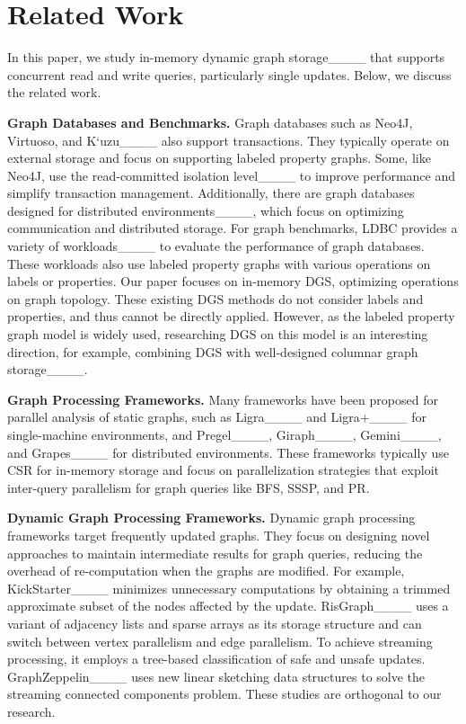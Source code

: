 \section{Related Work}
\label{sec:related_work}

In this paper, we study in-memory dynamic graph storage____ that supports concurrent read and write queries, particularly single updates. Below, we discuss the related work.

\noindent\textbf{Graph Databases and Benchmarks.} Graph databases such as Neo4J, Virtuoso, and K`uzu____ also support transactions. They typically operate on external storage and focus on supporting labeled property graphs. Some, like Neo4J, use the read-committed isolation level____ to improve performance and simplify transaction management. Additionally, there are graph databases designed for distributed environments____, which focus on optimizing communication and distributed storage. For graph benchmarks, LDBC provides a variety of workloads____ to evaluate the performance of graph databases. These workloads also use labeled property graphs with various operations on labels or properties. Our paper focuses on in-memory DGS, optimizing operations on graph topology. These existing DGS methods do not consider labels and properties, and thus cannot be directly applied. However, as the labeled property graph model is widely used, researching DGS on this model is an interesting direction, for example, combining DGS with well-designed columnar graph storage____.

\noindent\textbf{Graph Processing Frameworks.} Many frameworks have been proposed for parallel analysis of static graphs, such as Ligra____ and Ligra+____ for single-machine environments, and Pregel____, Giraph____, Gemini____, and Grapes____ for distributed environments. These frameworks typically use CSR for in-memory storage and focus on parallelization strategies that exploit inter-query parallelism for graph queries like BFS, SSSP, and PR.

\noindent\textbf{Dynamic Graph Processing Frameworks.} Dynamic graph processing frameworks target frequently updated graphs. They focus on designing novel approaches to maintain intermediate results for graph queries, reducing the overhead of re-computation when the graphs are modified. For example, KickStarter____ minimizes unnecessary computations by obtaining a trimmed approximate subset of the nodes affected by the update. RisGraph____ uses a variant of adjacency lists and sparse arrays as its storage structure and can switch between vertex parallelism and edge parallelism. To achieve streaming processing, it employs a tree-based classification of safe and unsafe updates. GraphZeppelin____ uses new linear sketching data structures to solve the streaming connected components problem. These studies are orthogonal to our research.